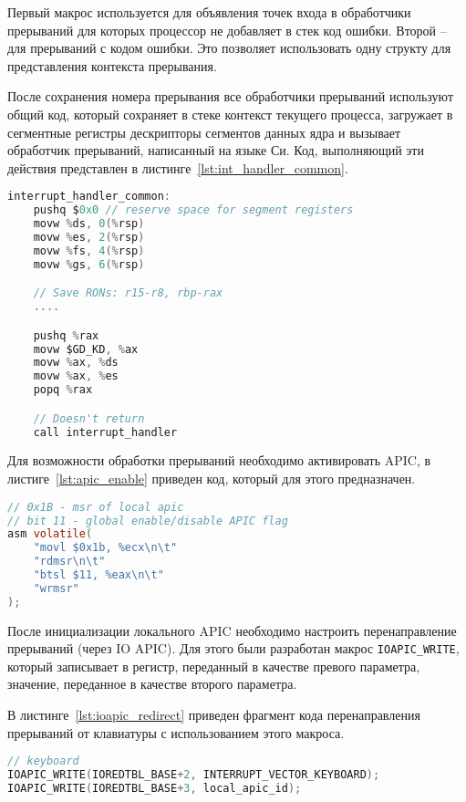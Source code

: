 Первый макрос используется для объявления точек входа в обработчики прерываний для
которых процессор не добавляет в стек код ошибки. Второй -- для прерываний с кодом
ошибки. Это позволяет использовать одну структу для представления контекста прерывания.

После сохранения номера прерывания все обработчики прерываний используют общий код,
который сохраняет в стеке контекст текущего процесса, загружает в сегментные регистры
дескрипторы сегментов данных ядра и вызывает обработчик прерываний, написанный на
языке Си. Код, выполняющий эти действия представлен в листинге~\ref{lst:int_handler_common}.

\begin{lstlisting}[language=C,
caption={Общий код обработчиков прерываний},
label={lst:int_handler_common}]
interrupt_handler_common:
	pushq $0x0 // reserve space for segment registers
	movw %ds, 0(%rsp)
	movw %es, 2(%rsp)
	movw %fs, 4(%rsp)
	movw %gs, 6(%rsp)

	// Save RONs: r15-r8, rbp-rax
	....

	pushq %rax
	movw $GD_KD, %ax
	movw %ax, %ds
	movw %ax, %es
	popq %rax

	// Doesn't return
	call interrupt_handler
\end{lstlisting}

Для возможности обработки прерываний необходимо активировать APIC,
в листиге~\ref{lst:apic_enable} приведен код, который для этого предназначен.
\begin{lstlisting}[language=C,
caption={Активация локального APIC},
label={lst:apic_enable}]
// 0x1B - msr of local apic
// bit 11 - global enable/disable APIC flag
asm volatile(
	"movl $0x1b, %ecx\n\t"
	"rdmsr\n\t"
	"btsl $11, %eax\n\t"
	"wrmsr"
);
\end{lstlisting}

После инициализации локального APIC необходимо настроить перенаправление прерываний (через IO APIC).
Для этого были разработан макрос \texttt{IOAPIC\_WRITE}, который записывает в регистр, переданный
в качестве превого параметра, значение, переданное в качестве второго параметра.

В листинге~\ref{lst:ioapic_redirect} приведен фрагмент кода перенаправления прерываний от клавиатуры
с использованием этого макроса.

\begin{lstlisting}[language=C,
caption={Настройка IOAPIC},
label={lst:ioapic_redirect}]
// keyboard
IOAPIC_WRITE(IOREDTBL_BASE+2, INTERRUPT_VECTOR_KEYBOARD);
IOAPIC_WRITE(IOREDTBL_BASE+3, local_apic_id);
\end{lstlisting}

